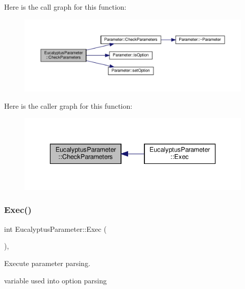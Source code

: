 Here is the call graph for this function\+:
\nopagebreak
\begin{figure}[H]
\begin{center}
\leavevmode
\includegraphics[width=350pt]{d0/d5b/classEucalyptusParameter_a669c0350f1d4997568f0d9121abe9c3a_cgraph}
\end{center}
\end{figure}
Here is the caller graph for this function\+:
\nopagebreak
\begin{figure}[H]
\begin{center}
\leavevmode
\includegraphics[width=336pt]{d0/d5b/classEucalyptusParameter_a669c0350f1d4997568f0d9121abe9c3a_icgraph}
\end{center}
\end{figure}
\mbox{\label{classEucalyptusParameter_ac4a336c1c386a2cbd9adc9dfb637b04b}} 
\subsubsection{\texorpdfstring{Exec()}{Exec()}}
{\footnotesize\ttfamily int Eucalyptus\+Parameter\+::\+Exec (\begin{DoxyParamCaption}{ }\end{DoxyParamCaption})\hspace{0.3cm}{\ttfamily [override]}, {\ttfamily [virtual]}}



Execute parameter parsing. 

variable used into option parsing

